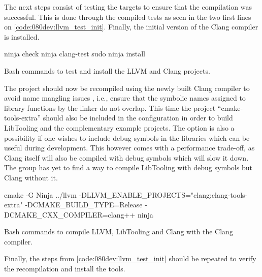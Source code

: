 The next steps consist of testing the targets to ensure that the compilation was successful. This is done through the compiled tests as seen in the two first lines on \cref{code:080dev:llvm_test_init}. Finally, the initial version of the Clang compiler is installed.

\begin{listing}[H]
    \begin{bashcode}
ninja check
ninja clang-test
sudo ninja install
    \end{bashcode}
    \caption{Bash commands to test and install the LLVM and Clang projects.}
    \label{code:080dev:llvm_test_init}
\end{listing}

The project should now be recompiled using the newly built Clang compiler to avoid name mangling issues \cite{ibmIBMDocumentation2021}, i.e., ensure that the symbolic names assigned to library functions by the linker do not overlap. This time the project ``cmake-tools-extra'' should also be included in the configuration in order to build LibTooling and the complementary example projects.
The option  is also a possibility if one wishes to include debug symbols in the libraries which can be useful during development. This however comes with a performance trade-off, as Clang itself will also be compiled with debug symbols which will slow it down.
The group has yet to find a way to compile LibTooling with debug symbols but Clang without it.

\begin{listing}[H]
    \begin{bashcode}
cmake -G Ninja ../llvm -DLLVM_ENABLE_PROJECTS="clang;clang-tools-extra" -DCMAKE_BUILD_TYPE=Release -DCMAKE_CXX_COMPILER=clang++
ninja
    \end{bashcode}
    \caption{Bash commands to compile LLVM, LibTooling and Clang with the Clang compiler.}
    \label{code:080dev:llvm_compile_final}
\end{listing}

Finally, the steps from \cref{code:080dev:llvm_test_init} should be repeated to verify the recompilation and install the tools.